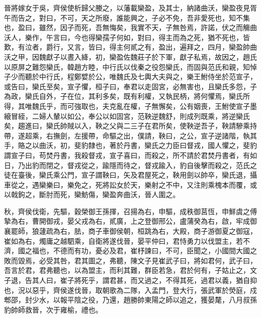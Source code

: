 \begin{pinyinscope}
晉將嫁女于吳，齊侯使析歸父媵之，以藩載欒盈，及其士，納諸曲沃，欒盈夜見胥午而告之，對曰，不可，天之所廢，誰能興之，子必不免，吾非愛死也，知不集也，盈曰，雖然，因子而死，吾無悔矣，我實不天，子無咎焉，許諾，伏之而觴曲沃人，樂作，午言曰，今也得欒孺子何如，對曰，得主而為之死，猶不死也，皆歎，有泣者，爵行，又言，皆曰，得主何貳之有，盈出，遍拜之，四月，欒盈帥曲沃之甲，因魏獻子以晝入絳，初，欒盈佐魏莊子於下軍，獻子私焉，故因之，趙氏以原屏之難怨欒氏，韓趙方睦，中行氏以伐秦之役怨欒氏，而固與范氏和親，知悼子少而聽於中行氏，程鄭嬖於公，唯魏氏及七輿大夫與之，樂王鮒侍坐於范宣子，或告曰，欒氏至矣，宣子懼，桓子曰，奉君以走固宮，必無害也，且欒氏多怨，子為政，欒氏自外，子在位，其利多矣，既有利權，又執民柄，將何懼焉，欒氏所得，其唯魏氏乎，而可強取也，夫克亂在權，子無懈矣，公有姻喪，王鮒使宣子墨縗冒絰，二婦人輦以如公，奉公以如固宮，范鞅逆魏舒，則成列既乘，將逆欒氏矣，趨進曰，欒氏帥賊以入，鞅之父與二三子在君所矣，使鞅逆吾子，鞅請驂乘持帶，遂超乘，右撫劍，左援帶，命驅之出，僕請，鞅曰，之公，宣子逆諸階，執其手，賂之以曲沃，初，斐豹隸也，著於丹書，欒氏之力臣曰督戎，國人懼之，斐豹謂宣子曰，苟焚丹書，我殺督戎，宣子喜曰，而殺之，所不請於君焚丹書者，有如日，乃出豹而閉之，督戎從之，踰隱而待之，督戎踰入，豹自後擊而殺之，范氏之徒在臺後，欒氏乘公門，宣子謂鞅曰，矢及君屋死之，鞅用劍以帥卒，欒氏退，攝車從之，遇欒樂曰，樂免之，死將訟女於天，樂射之不中，又注則乘槐本而覆，或以戟鉤之，斷肘而死，欒魴傷，欒盈奔曲沃，晉人圍之。

秋，齊侯伐衛，先驅，穀榮御王孫揮，召揚為右，申驅，成秩御莒恆，申鮮虞之傅摯為右，曹開御戎，晏父戎為右，貳廣，上之登御邢公，盧蒲癸為右，啟，牢成御襄罷師，狼蘧疏為右，胠，商子車御侯朝，桓跳為右，大殿，商子游御夏之御寇，崔如為右，燭庸之越駟乘，自衛將遂伐晉，晏平仲曰，君恃勇力以伐盟主，若不濟，國之福也，不德而有功，憂必及君，崔杼諫曰，不可，臣聞之，小國間大國之敗而毀焉，必受其咎，君其圖之，弗聽，陳文子見崔武子曰，將如君何，武子曰，吾言於君，君弗聽也，以為盟主，而利其難，群臣若急，君於何有，子姑止之，文子退，告其人曰，崔子將死乎，謂君甚，而又過之，不得其死，過君以義，猶自抑也，況以惡乎，齊侯遂伐晉，取朝歌為二隊，入孟門，登大行，張武軍於熒庭，戍郫邵，封少水，以報平陰之役，乃還，趙勝帥東陽之師以追之，獲晏氂，八月叔孫豹帥師救晉，次于雍榆，禮也。


\end{pinyinscope}
